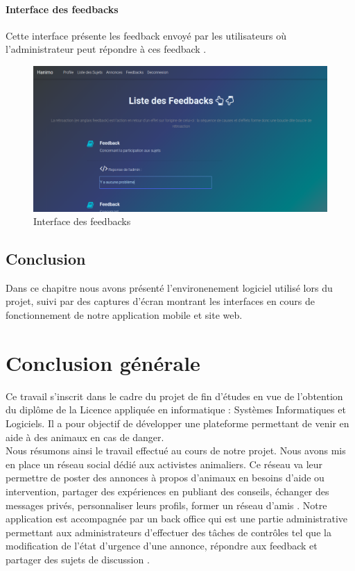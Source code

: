 \documentclass[11pt,a4paper,oneside]{book}
\begin{document}
					\subsubsection{Interface des feedbacks}
					Cette interface présente les feedback envoyé par les utilisateurs où l’administrateur peut répondre à ces feedback .
					\begin{figure}[H]
						\centering
						\includegraphics[width=1\textwidth]{"newest maquettes/repondre au feedback"}
						\caption{Interface des feedbacks}
						\label{fig:repondre-au-feedback}
					\end{figure}
					
					\section{Conclusion}
					Dans ce chapitre nous avons présenté l’environenement logiciel utilisé lors du projet, suivi par des captures d’écran montrant les interfaces en cours de fonctionnement de notre application mobile et site web.
					\backmatter
					\chapter{Conclusion générale}
					Ce travail s’inscrit dans le cadre du projet de fin d’études en vue de l’obtention du diplôme de la
					Licence appliquée en informatique : Systèmes Informatiques et Logiciels. Il a pour objectif de développer une plateforme permettant de venir en aide à des animaux en cas de danger. \\
					
					Nous résumons ainsi le travail effectué au cours de notre projet. Nous avons mis en place un réseau social dédié aux activistes animaliers. Ce réseau va leur permettre de poster des annonces à propos d’animaux en besoins d’aide ou intervention, partager des expériences en publiant des conseils, échanger des messages privés, personnaliser leurs profils, former un réseau d’amis . Notre application est accompagnée par un back office qui est une partie administrative permettant aux administrateurs d’effectuer des tâches de contrôles tel que la modification de l'état d’urgence d’une annonce, répondre aux feedback et partager des sujets de discussion .\\
					
\end{document}
